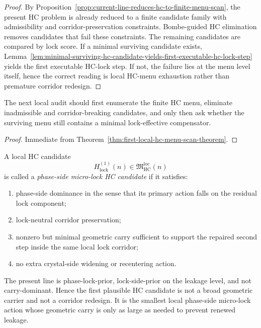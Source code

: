 \begin{proof}
By Proposition~\ref{prop:current-line-reduces-hc-to-finite-menu-scan}, the present HC problem is already reduced to a finite candidate family with admissibility and corridor-preservation constraints. Bombe-guided HC elimination removes candidates that fail these constraints. The remaining candidates are compared by lock score. If a minimal surviving candidate exists, Lemma~\ref{lem:minimal-surviving-hc-candidate-yields-first-executable-hc-lock-step} yields the first executable HC-lock step. If not, the failure lies at the menu level itself, hence the correct reading is local HC-menu exhaustion rather than premature corridor redesign.
\end{proof}

\begin{corollary}
\label{cor:current-hc-menu-scan-working-rule}
The next local audit should first enumerate the finite HC menu, eliminate inadmissible and corridor-breaking candidates, and only then ask whether the surviving menu still contains a minimal lock-effective compensator.
\end{corollary}

\begin{proof}
Immediate from Theorem~\ref{thm:first-local-hc-menu-scan-theorem}.
\end{proof}



\begin{definition}
\label{def:phase-side-micro-lock-hc-candidate}
A local HC candidate
\[
  H_{\mathrm{lock}}^{(1)}(n)\in \mathfrak M_{\mathrm{HC}}^{\mathrm{loc}}(n)
\]
is called a \emph{phase-side micro-lock HC candidate} if it satisfies:
\begin{enumerate}[leftmargin=2em,label=(\alph*)]
  \item phase-side dominance in the sense that its primary action falls on the residual lock component;
  \item lock-neutral corridor preservation;
  \item nonzero but minimal geometric carry sufficient to support the repaired second step inside the same local lock corridor;
  \item no extra crystal-side widening or recentering action.
\end{enumerate}
\end{definition}

\begin{remark}
\label{rem:why-this-is-the-first-plausible-hc-menu-entry}
The present line is phase-lock-prior, lock-side-prior on the leakage level, and not carry-dominant. Hence the first plausible HC candidate is not a broad geometric carrier and not a corridor redesign. It is the smallest local phase-side micro-lock action whose geometric carry is only as large as needed to prevent renewed leakage.
\end{remark}

